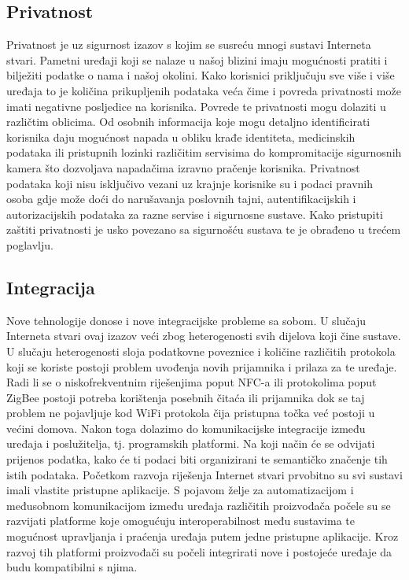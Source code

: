 \documentclass[times, utf8, diplomski]{fer}
\begin{document}
\subsection{Privatnost}
Privatnost je uz sigurnost izazov s kojim se susreću mnogi sustavi Interneta stvari. Pametni uređaji koji se nalaze u našoj blizini imaju mogućnosti pratiti i bilježiti podatke o nama i našoj okolini. Kako korisnici priključuju sve više i više uređaja to je količina prikupljenih podataka veća čime i povreda privatnosti može imati negativne posljedice na korisnika. Povrede te privatnosti mogu dolaziti u različtim oblicima. Od osobnih informacija koje mogu detaljno identificirati korisnika daju mogućnost napada u obliku krađe identiteta, medicinskih podataka ili pristupnih lozinki različitim servisima do kompromitacije sigurnosnih kamera što dozvoljava napadačima izravno pračenje korisnika. Privatnost podataka koji nisu isključivo vezani uz krajnje korisnike su i podaci pravnih osoba gdje može doći do narušavanja poslovnih tajni, autentifikacijskih i autorizacijskih podataka za razne servise i sigurnosne sustave. Kako pristupiti zaštiti privatnosti je usko povezano sa sigurnošću sustava te je obrađeno u trećem poglavlju.

\subsection{Integracija}
Nove tehnologije donose i nove integracijske probleme sa sobom. U slučaju Interneta stvari ovaj izazov veći zbog heterogenosti svih dijelova koji čine sustave. U slučaju heterogenosti sloja podatkovne poveznice i količine različitih protokola koji se koriste postoji problem uvođenja novih prijamnika i prilaza za te uređaje. Radi li se o niskofrekventnim riješenjima poput NFC-a ili protokolima poput ZigBee postoji potreba korištenja posebnih čitaća ili prijamnika dok se taj problem ne pojavljuje kod WiFi protokola čija pristupna točka već postoji u većini domova. Nakon toga dolazimo do komunikacijske integracije između uređaja i poslužitelja, tj. programskih platformi. Na koji način će se odvijati prijenos podatka, kako će ti podaci biti organizirani te semantičko značenje tih istih podataka. Početkom razvoja riješenja Internet stvari prvobitno su svi sustavi imali vlastite pristupne aplikacije. S pojavom želje za automatizacijom i međusobnom komunikacijom između uređaja različitih proizvođača počele su se razvijati platforme koje omogućuju interoperabilnost među sustavima te mogućnost upravljanja i praćenja uređaja putem jedne pristupne aplikacije. Kroz razvoj tih platformi proizvođači su počeli integrirati nove i postojeće uređaje da budu kompatibilni s njima.
\end{document}

